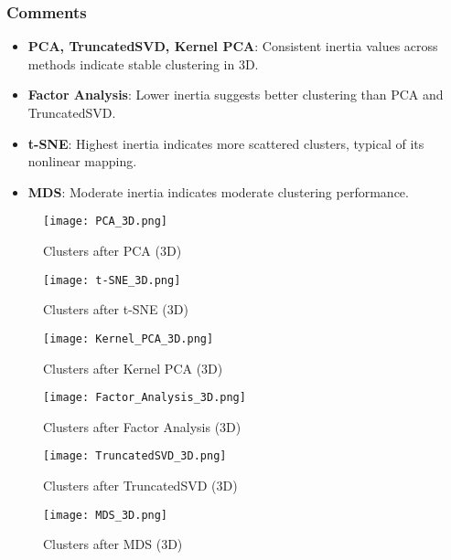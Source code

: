 \documentclass{article}
\begin{document}
\subsubsection{Comments}
\begin{itemize}
    \item \textbf{PCA, TruncatedSVD, Kernel PCA}: Consistent inertia values across methods indicate stable clustering in 3D.
    \item \textbf{Factor Analysis}: Lower inertia suggests better clustering than PCA and TruncatedSVD.
    \item \textbf{t-SNE}: Highest inertia indicates more scattered clusters, typical of its nonlinear mapping.
    \item \textbf{MDS}: Moderate inertia indicates moderate clustering performance.
\end{itemize}

\begin{figure}[H]
    \centering
    \texttt{[image: PCA\_3D.png]}
    \caption{Clusters after PCA (3D)}
    \label{fig:pca_3d}
\end{figure}

\begin{figure}[H]
    \centering
    \texttt{[image: t-SNE\_3D.png]}
    \caption{Clusters after t-SNE (3D)}
    \label{fig:tsne_3d}
\end{figure}

\begin{figure}[H]
    \centering
    \texttt{[image: Kernel\_PCA\_3D.png]}
    \caption{Clusters after Kernel PCA (3D)}
    \label{fig:kernel_pca_3d}
\end{figure}

\begin{figure}[H]
    \centering
    \texttt{[image: Factor\_Analysis\_3D.png]}
    \caption{Clusters after Factor Analysis (3D)}
    \label{fig:factor_analysis_3d}
\end{figure}

\begin{figure}[H]
    \centering
    \texttt{[image: TruncatedSVD\_3D.png]}
    \caption{Clusters after TruncatedSVD (3D)}
    \label{fig:truncated_svd_3d}
\end{figure}

\begin{figure}[H]
    \centering
    \texttt{[image: MDS\_3D.png]}
    \caption{Clusters after MDS (3D)}
    \label{fig:mds_3d}
\end{figure}
\end{document}
